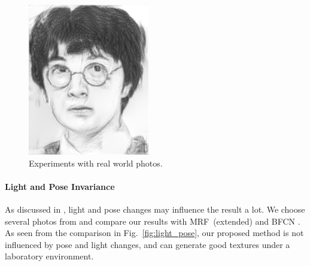 \documentclass[10pt,twocolumn,letterpaper]{article}
\begin{document}
\begin{figure}[htbp]
{\begin{minipage}[b]{0.22\linewidth}
\includegraphics[width=0.99\linewidth]{img/real_world_photos/ours_r4.png}
\end{minipage}
}
\caption{Experiments with real world photos.}
\label{fig:real_world}
\end{figure}


\paragraph{Light and Pose Invariance} As discussed in \cite{zhang2010lighting}, light and pose changes may influence the result a lot. We choose several photos from \cite{zhang2010lighting} and compare our results with MRF~(extended) \cite{zhang2010lighting} and BFCN \cite{zhang2017content}. As seen from the comparison in Fig.~\ref{fig:light_pose}, our proposed method is not influenced by pose and light changes, and can generate good textures under a laboratory environment. 
\end{document}
